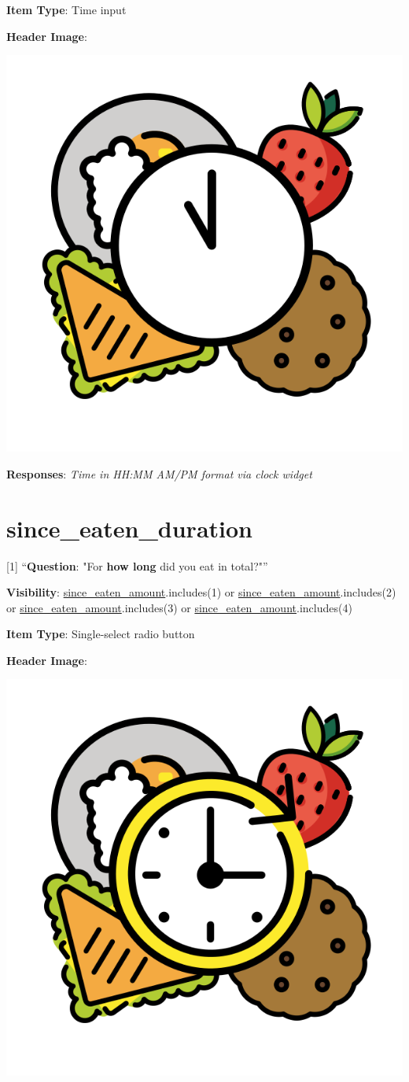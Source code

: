 \documentclass[]{book}
\begin{document}
\textbf{Item Type}: Time input

\textbf{Header Image}:

\begin{flushleft}\includegraphics[width=0.33\linewidth]{downloadFigs4latex_NIMH_Applet_Codebook/since_eaten_when_headerImg} \end{flushleft}

\textbf{Responses}: \emph{Time in HH:MM AM/PM format via clock widget}

\hypertarget{since_eaten_duration}{%
\section{since\_eaten\_duration}\label{since_eaten_duration}}

{[}1{]} ``\textbf{Question}: "For \textbf{how long} did you eat in total?"''

\textbf{Visibility}: \protect\hyperlink{since_eaten_amount}{since\_eaten\_amount}.includes(1) or \protect\hyperlink{since_eaten_amount}{since\_eaten\_amount}.includes(2) or \protect\hyperlink{since_eaten_amount}{since\_eaten\_amount}.includes(3) or \protect\hyperlink{since_eaten_amount}{since\_eaten\_amount}.includes(4)

\textbf{Item Type}: Single-select radio button

\textbf{Header Image}:

\begin{flushleft}\includegraphics[width=0.33\linewidth]{downloadFigs4latex_NIMH_Applet_Codebook/since_eaten_duration_headerImg} \end{flushleft}
\end{document}
